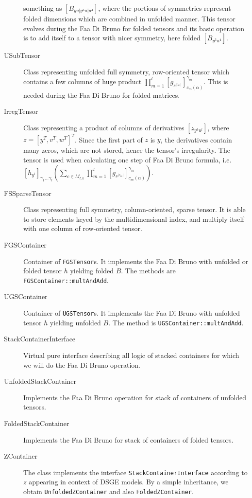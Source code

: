 \documentclass[11pt,a4paper]{article}
\begin{document}
\begin{description}
something as $\left[B_{yu\vert y^3u\vert u^4}\right]$, where the
portions of symmetries represent folded dimensions which are combined
in unfolded manner. This tensor evolves during the Faa Di Bruno
for folded tensors and its basic operation is to add itself to a
tensor with nicer symmetry, here folded $\left[B_{y^3u^4}\right]$.
\item[USubTensor] 
Class representing unfolded full symmetry, row-oriented tensor which
contains a few columns of huge product
$\prod_{m=1}^l\left[g_{s^{\vert c_m\vert}}\right]^{\gamma_m}_{c_m(\alpha)}$. This is
needed during the Faa Di Bruno for folded matrices.
\item[IrregTensor] 
Class representing a product of columns of derivatives
$\left[z_{y^ku^l}\right]$, where $z=[y^T,v^T,w^T]^T$. Since the first
part of $z$ is $y$, the derivatives contain many zeros, which are not
stored, hence the tensor's irregularity. The tensor is used when
calculating one step of Faa Di Bruno formula, i.e.
$\left[h_{y^l}\right]_{\gamma_1\ldots\gamma_l}
\left(\sum_{c\in M_{l,k}}
\prod_{m=1}^l\left[g_{s^{\vert c_m\vert}}\right]^{\gamma_m}_{c_m(\alpha)}\right)$.
\item[FSSparseTensor] 
Class representing full symmetry, column-oriented, sparse tensor. It
is able to store elements keyed by the multidimensional index, and
multiply itself with one column of row-oriented tensor.
\item[FGSContainer] 
Container of \texttt{FGSTensor}s. It implements the Faa Di Bruno with
unfolded or folded tensor $h$ yielding folded $B$. The methods are
\texttt{FGSContainer::multAndAdd}.
\item[UGSContainer] 
Container of \texttt{UGSTensor}s. It implements the Faa Di Bruno with
unfolded tensor $h$ yielding unfolded $B$. The method is
\texttt{UGSContainer::multAndAdd}.
\item[StackContainerInterface] 
Virtual pure interface describing all logic
of stacked containers for which we will do the Faa Di Bruno operation. 
\item[UnfoldedStackContainer] 
Implements the Faa Di Bruno operation for stack of
containers of unfolded tensors.
\item[FoldedStackContainer] 
Implements the Faa Di Bruno for stack of
containers of folded tensors.
\item[ZContainer] 
The class implements the interface \texttt{StackContainerInterface} according
to $z$ appearing in context of DSGE models. By a simple inheritance,
we obtain \texttt{UnfoldedZContainer} and also \texttt{FoldedZContainer}.

\end{description}
\end{document}
